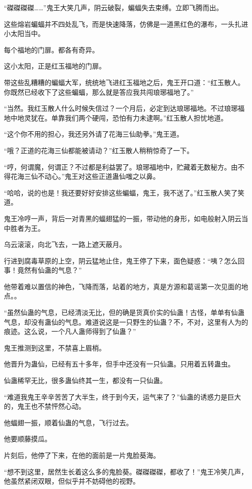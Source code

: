 \begin{this_body}
“磔磔磔磔……”鬼王大笑几声，阴云破裂，蝙蝠失去束缚。立即飞腾而出。

这些熔岩蝙蝠并不四处乱飞，而是快速降落，仿佛是一道黑红色的瀑布，一头扎进小太阳当中。

每个福地的门扉。都各有奇异。

这小太阳，正是红玉福地的门扉。

带这些乱糟糟的蝙蝠大军，统统地飞进红玉福地之后，鬼王开口道：“红玉散人。你既然已经收下了这些蝙蝠，那么就是答应我共闯琅琊福地了。”

“当然。我红玉散人什么时候失信过？一个月后，必定到达琅琊福地。不过琅琊福地中地灵犹在。单靠我们两个硬闯，恐怕有力未逮啊。”红玉散人担忧地道。

“这个你不用的担心，我还另外请了花海三仙助拳。”鬼王道。

“哦？正道的花海三仙都能被请动？”红玉散人稍稍惊奇了一下。

“哼，何谓魔，何谓正？不过都是利益罢了。琅琊福地中，贮藏着无数秘方。由不得花海三仙不动心。”鬼王对这些正道蛊仙嗤之以鼻。

“哈哈，说的也是！我还要好好安排这些蝙蝠，鬼王，我不送了。”红玉散人笑了笑道。

鬼王冷哼一声，背后一对青黑的蝠翅猛的一振，带动他的身形，如电般射入阴云当中胜者为王。

乌云滚滚，向北飞去，一路上遮天蔽月。

行进到腐毒草原的上空，阴云猛地止住，鬼王停了下来，面色疑惑：“咦？怎么回事！竟然有仙蛊的气息？”

他带着难以置信的神色，飞降而落，站着的地方，真是方源和葛谣第一次见面的地点。。

“虽然仙蛊的气息，已经清淡无比，但的确是货真价实的仙蛊！古怪，单单有仙蛊气息，却没有蛊仙的气息。难道说这是一只野生的仙蛊？不，不对，这里有人为的痕迹。这么说，一个凡人蛊师得到了仙蛊？”

鬼王推测到这里，不禁喜上眉梢。

他晋升为蛊仙，已经有五十多年，但手中还没有一只仙蛊。只用着五转蛊虫。

仙蛊稀罕无比，很多蛊仙终其一生，都没有一只仙蛊。

“难道我鬼王辛辛苦苦了大半生，终于到今天，运气来了？”仙蛊的诱惑力是巨大的，鬼王也不禁怦然心动。

他蝠翅一振，顺着仙蛊的气息，飞行过去。

他要顺藤摸瓜。

片刻后，他停了下来，在他的面前是一片鬼脸葵海。

“想不到这里，居然生长着这么多的鬼脸葵。磔磔磔磔，都收了！”鬼王冷笑几声，他虽然紧闭双眼，但似乎并不妨碍他的视野。


\end{this_body}
